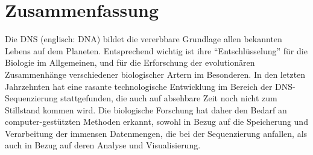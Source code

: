 

\chapter*{Zusammenfassung}

Die DNS (englisch: DNA) bildet die vererbbare Grundlage allen bekannten Lebens auf dem Planeten.
Entsprechend wichtig ist ihre ``Entschl\"usselung'' f\"ur die Biologie im Allgemeinen,
und f\"ur die Erforschung der evolution\"aren Zusammenh\"ange verschiedener biologischer Artern im Besonderen.
In den letzten Jahrzehnten hat eine rasante technologische Entwicklung im Bereich der DNS-Sequenzierung stattgefunden,
die auch auf absehbare Zeit noch nicht zum Stillstand kommen wird.
Die biologische Forschung hat daher den Bedarf an computer-gest\"utzten Methoden erkannt,
sowohl in Bezug auf die Speicherung und Verarbeitung der immensen Datenmengen, die bei der Sequenzierung anfallen,
als auch in Bezug auf deren Analyse und Visualisierung.

